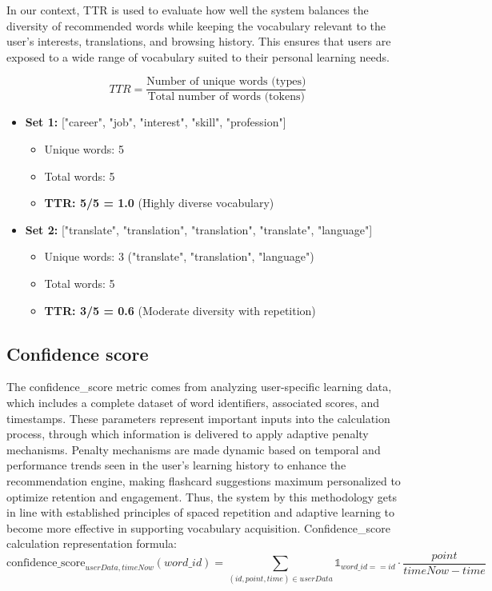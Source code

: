 \documentclass{article}
\begin{document}
In our context, TTR is used to evaluate how well the system balances the diversity of recommended words while keeping the vocabulary relevant to the user’s interests, translations, and browsing history. This ensures that users are exposed to a wide range of vocabulary suited to their personal learning needs.

\[
TTR = \frac{\text{Number of unique words (types)}}{\text{Total number of words (tokens)}}
\]

\begin{itemize}
    \item \textbf{Set 1: }["career", "job", "interest", "skill", "profession"]
    \begin{itemize}
        \item Unique words: 5
        \item Total words: 5
        \item \textbf{TTR: 5/5 = 1.0} (Highly diverse vocabulary)
    \end{itemize}
    \item \textbf{Set 2: }["translate", "translation", "translation", "translate", "language"]
    \begin{itemize}
        \item Unique words: 3 ("translate", "translation", "language")
        \item Total words: 5
        \item \textbf{TTR: 3/5 = 0.6} (Moderate diversity with repetition)
    \end{itemize}
\end{itemize}

\subsection{Confidence score}
\label{sec:confidence-score}
The confidence\_score metric comes from analyzing user-specific learning data, which includes a complete dataset of word identifiers, associated scores, and timestamps. These parameters represent important inputs into the calculation process, through which information is delivered to apply adaptive penalty mechanisms. Penalty mechanisms are made dynamic based on temporal and performance trends seen in the user's learning history to enhance the recommendation engine, making flashcard suggestions maximum personalized to optimize retention and engagement. Thus, the system by this methodology gets in line with established principles of spaced repetition and adaptive learning to become more effective in supporting vocabulary acquisition. Confidence\_score calculation representation formula:
\[
    \text{confidence\_score}_{userData, timeNow}(word\_id) = \sum_{(id, point, time)\in userData}\mathbb{1}_{word\_id==id}\cdot \frac{point}{timeNow-time}
\]
\end{document}
